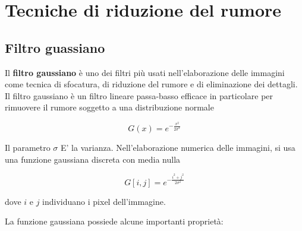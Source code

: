 \documentclass[../main.tex]{subfiles}
\begin{document}
	\section{Tecniche di riduzione del rumore}
	
	\subsection{Filtro guassiano}
	
	Il \textbf{filtro gaussiano} è uno dei filtri più usati nell'elaborazione delle immagini come  tecnica di sfocatura, di riduzione del rumore e di eliminazione dei dettagli. Il filtro gaussiano è un filtro lineare passa-basso efficace in particolare per rimuovere il rumore soggetto a una distribuzione normale
	
	\begin{equation}
		G(x) = e^{-\frac{x^2}{2\sigma^2}}
	\end{equation}
	
	Il parametro $\sigma$ E' la varianza. Nell'elaborazione numerica delle immagini, si usa una funzione gaussiana discreta con media nulla  \cite{ito_2000}
	
	\begin{equation}
		G[i,j] = e^{-\frac{i^2+j^2}{2\sigma^2}}
	\end{equation}
	
	dove $i$ e $j$ individuano i pixel dell'immagine.
	
	La funzione gaussiana possiede alcune importanti proprietà: \cite{wang_2014,getreuer_2013}
	
\end{document}
